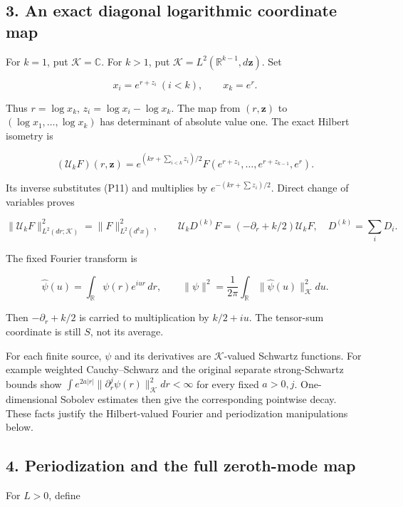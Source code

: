 \subsection{3. An exact diagonal logarithmic coordinate map}\label{endpoint-periodized_original--an-exact-diagonal-logarithmic-coordinate-map}

For \(k=1\), put \(\mathcal K=\mathbb C\). For \(k>1\), put \(\mathcal K=L^2(\mathbb R^{k-1},d\mathbf z)\). Set

\[
x_i=e^{r+z_i}\ (i<k),\qquad x_k=e^r.
\tag{P11}
\]

Thus \(r=\log x_k\), \(z_i=\log x_i-\log x_k\). The map from \((r,\mathbf z)\) to \((\log x_1,\ldots,\log x_k)\) has determinant of absolute value one. The exact Hilbert isometry is

\[
(\mathcal U_kF)(r,\mathbf z)
=e^{(kr+\sum_{i<k}z_i)/2}
F(e^{r+z_1},\ldots,e^{r+z_{k-1}},e^r).
\tag{P12}
\]

Its inverse substitutes (P11) and multiplies by \(e^{-(kr+\sum z_i)/2}\). Direct change of variables proves

\[
\|\mathcal U_kF\|^2_{L^2(dr;\mathcal K)}
=\|F\|^2_{L^2(d^kx)},\qquad
\mathcal U_kD^{(k)}F=(-\partial_r+k/2)\mathcal U_kF,
\quad D^{(k)}=\sum_iD_i.
\tag{P13}
\]

The fixed Fourier transform is

\[
\widehat\psi(u)=\int_{\mathbb R}\psi(r)e^{iur}\,dr,
\qquad
\|\psi\|^2=\frac1{2\pi}\int_{\mathbb R}\|\widehat\psi(u)\|_{\mathcal K}^2du.
\tag{P14}
\]

Then \(-\partial_r+k/2\) is carried to multiplication by \(k/2+iu\). The tensor-sum coordinate is still \(S\), not its average.

For each finite source, \(\psi\) and its derivatives are \(\mathcal K\)-valued Schwartz functions. For example weighted Cauchy--Schwarz and the original separate strong-Schwartz bounds show \(\int e^{2a|r|}\|\partial_r^j\psi(r)\|_{\mathcal K}^2dr<\infty\) for every fixed \(a>0,j\). One-dimensional Sobolev estimates then give the corresponding pointwise decay. These facts justify the Hilbert-valued Fourier and periodization manipulations below.

\subsection{4. Periodization and the full zeroth-mode map}\label{endpoint-periodized_original--periodization-and-the-full-zeroth-mode-map}

For \(L>0\), define

